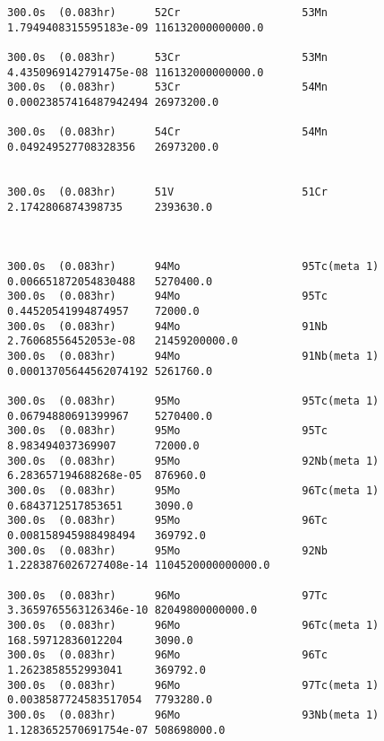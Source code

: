 \begin{lstlisting}[style=sOutputFile,caption={Final results for steel irradiation},label={listing:alexsteel}]
300.0s  (0.083hr)      52Cr                   53Mn                   1.7949408315595183e-09 116132000000000.0     

300.0s  (0.083hr)      53Cr                   53Mn                   4.4350969142791475e-08 116132000000000.0     
300.0s  (0.083hr)      53Cr                   54Mn                   0.00023857416487942494 26973200.0            

300.0s  (0.083hr)      54Cr                   54Mn                   0.049249527708328356   26973200.0            


300.0s  (0.083hr)      51V                    51Cr                   2.1742806874398735     2393630.0             



300.0s  (0.083hr)      94Mo                   95Tc(meta 1)           0.006651872054830488   5270400.0             
300.0s  (0.083hr)      94Mo                   95Tc                   0.44520541994874957    72000.0               
300.0s  (0.083hr)      94Mo                   91Nb                   2.76068556452053e-08   21459200000.0         
300.0s  (0.083hr)      94Mo                   91Nb(meta 1)           0.00013705644562074192 5261760.0             

300.0s  (0.083hr)      95Mo                   95Tc(meta 1)           0.06794880691399967    5270400.0             
300.0s  (0.083hr)      95Mo                   95Tc                   8.983494037369907      72000.0               
300.0s  (0.083hr)      95Mo                   92Nb(meta 1)           6.283657194688268e-05  876960.0              
300.0s  (0.083hr)      95Mo                   96Tc(meta 1)           0.6843712517853651     3090.0                
300.0s  (0.083hr)      95Mo                   96Tc                   0.008158945988498494   369792.0              
300.0s  (0.083hr)      95Mo                   92Nb                   1.2283876026727408e-14 1104520000000000.0    

300.0s  (0.083hr)      96Mo                   97Tc                   3.3659765563126346e-10 82049800000000.0      
300.0s  (0.083hr)      96Mo                   96Tc(meta 1)           168.59712836012204     3090.0                
300.0s  (0.083hr)      96Mo                   96Tc                   1.2623858552993041     369792.0              
300.0s  (0.083hr)      96Mo                   97Tc(meta 1)           0.0038587724583517054  7793280.0             
300.0s  (0.083hr)      96Mo                   93Nb(meta 1)           1.1283652570691754e-07 508698000.0           


\end{lstlisting}
